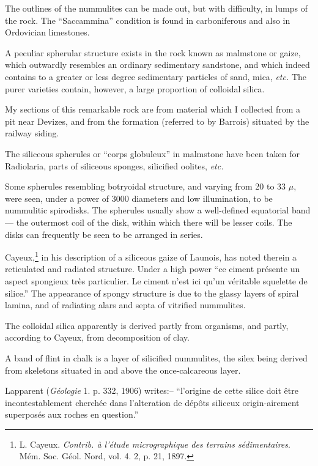 \documentclass[a4paper, 12pt, oneside, landscape]{article}
\begin{document}
The outlines of the nummulites can be made out, but with difficulty, in lumps of the rock. The ``Saccammina'' condition is found in carboniferous and also in Ordovician limestones.

A peculiar spherular structure exists in the rock known as malmstone or gaize, which outwardly resembles an ordinary sedimentary sandstone, and which indeed contains to a greater or less degree sedimentary particles of sand, mica, \emph{etc.} The purer varieties contain, however, a large proportion of colloidal silica.

My sections of this remarkable rock are from material which I collected from a pit near Devizes, and from the formation (referred to by Barrois) situated by the railway siding.

The siliceous spherules or ``corps globuleux'' in malmstone have been taken for Radiolaria, parts of siliceous sponges, silicified oolites, \emph{etc.}

Some spherules resembling botryoidal structure, and varying from 20 to 33 $\mu$, were seen, under a power of 3000 diameters and low illumination, to be nummulitic spirodisks. The spherules usually show a well-defined equatorial band --- the outermost coil of the disk, within which there will be lesser coils. The disks can frequently be seen to be arranged in series.

Cayeux,\footnote{L. Cayeux. \emph{Contrib. à l'étude micrographique des terrains sédimentaires}. Mém. Soc. Géol. Nord, vol. 4. 2, p. 21, 1897.} in his description of a siliceous gaize of Launois, has noted therein a reticulated and radiated structure. Under a high power ``ce ciment présente un aspect spongieux très particulier. Le ciment n'est ici qu'un véritable squelette de silice.'' The appearance of spongy structure is due to the glassy layers of spiral lamina, and of radiating alars and septa of vitrified nummulites.

The colloidal silica apparently is derived partly from organisms, and partly, according to Cayeux, from decomposition of clay.

A band of flint in chalk is a layer of silicified nummulites, the silex being derived from skeletons situated in and above the once-calcareous layer.

Lapparent (\emph{Géologie} 1. p. 332, 1906) writes:-- ``l'origine de cette silice doit être incontestablement cherchée dans l'alteration de dépôts siliceux origin-airement superposés aux roches en question.''
\end{document}

